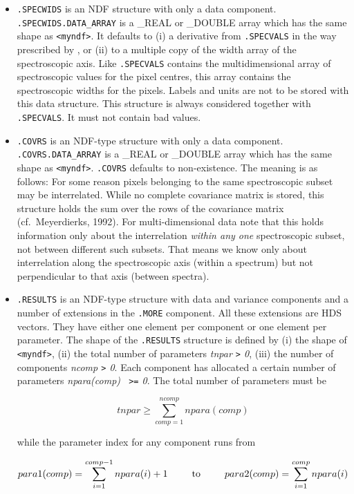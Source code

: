 \begin{itemize}
\item{\tt .SPECWIDS} is an NDF structure with only a data component.
   {\tt .SPECWIDS.DATA\_\-ARRAY} is a \_REAL or \_DOUBLE array which has
   the same shape as {\tt <myndf>}. It defaults to (i) a derivative from
   {\tt .SPECVALS} in the way prescribed by
,
   or (ii) to a multiple copy of the width array of the spectroscopic
   axis. Like {\tt .SPECVALS} contains the multidimensional array of
   spectroscopic values for the pixel centres, this array contains the
   spectroscopic widths for the pixels. Labels and units are not to be
   stored with this data structure. This structure is always considered
   together with {\tt .SPECVALS}. It must not contain bad values.

\item{\tt .COVRS} is an NDF-type structure with only a data component.
   {\tt .COVRS.DATA\_ARRAY} is a \_REAL or \_DOUBLE array which has the
   same shape as {\tt <myndf>}. {\tt .COVRS} defaults to
   non-existence. The meaning is as follows: For some reason pixels
   belonging to the same spectroscopic subset may be interrelated. While
   no complete covariance matrix is stored, this structure holds the sum
   over the rows of the covariance matrix (cf.\ Meyerdierks, 1992). For
   multi-dimensional data note that this holds information only about
   the interrelation {\it within any one} spectroscopic subset, not
   between different such subsets. That means we know only about
   interrelation along the spectroscopic axis (within a spectrum) but
   not perpendicular to that axis (between spectra). 

\item{\tt .RESULTS} is an NDF-type structure with data and variance
   components and a number of extensions in the {\tt .MORE}
   component. All these extensions are HDS vectors. They have either one
   element per component or one element per parameter. The shape of the
   {\tt .RESULTS} structure is defined by (i) the shape of {\tt
   <myndf>}, (ii) the total number of parameters {\it tnpar {\tt>} 0},
   (iii) the number of components {\it ncomp {\tt>} 0}. Each component
   has allocated a certain number of parameters {\it npara(comp) {\tt
   >=} 0}. The total number of parameters must be

   \[tnpar\geq\sum_{comp=1}^{ncomp}npara(comp)\]

   while the parameter index for any component runs from

   \[para1(comp)=\sum_{i=1}^{comp-1}npara(i)+1
   \mbox{\phantom{mmm}to\phantom{mmm}}
   para2(comp)=\sum_{i=1}^{comp}npara(i)\]


\end{itemize}
